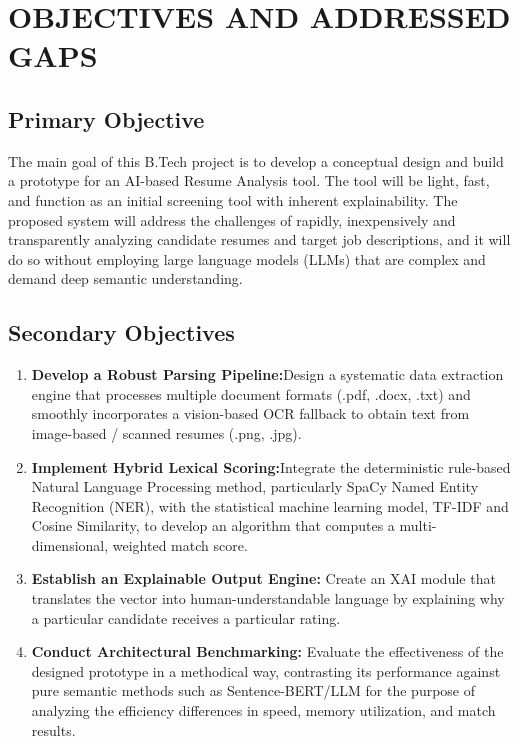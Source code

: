 \chapter{OBJECTIVES AND ADDRESSED GAPS}

\section{Primary Objective}
The main goal of this B.Tech project is to develop a conceptual design and build a prototype for an AI-based Resume Analysis tool. The tool will be light, fast, and function as an initial screening tool with inherent explainability. The proposed system will address the challenges of rapidly, inexpensively and transparently analyzing candidate resumes and target job descriptions, and it will do so without employing large language models (LLMs) that are complex and demand deep semantic understanding.

\section{Secondary Objectives}
\begin{enumerate}
    \item \textbf{Develop a Robust Parsing Pipeline:}Design a systematic data extraction engine that processes multiple document formats (.pdf, .docx, .txt) and smoothly incorporates a vision-based OCR fallback to obtain text from image-based / scanned resumes (.png, .jpg).
    \item \textbf{Implement Hybrid Lexical Scoring:}Integrate the deterministic rule-based Natural Language Processing method, particularly SpaCy Named Entity Recognition (NER), with the statistical machine learning model, TF-IDF and Cosine Similarity, to develop an algorithm that computes a multi-dimensional, weighted match score.
    \item \textbf{Establish an Explainable Output Engine:} Create an XAI module that translates the vector into human-understandable language by explaining why a particular candidate receives a particular rating.
    \item \textbf{Conduct Architectural Benchmarking:} Evaluate the effectiveness of the designed prototype in a methodical way, contrasting its performance against pure semantic methods such as Sentence-BERT/LLM for the purpose of analyzing the efficiency differences in speed, memory utilization, and match results.
\end{enumerate}

